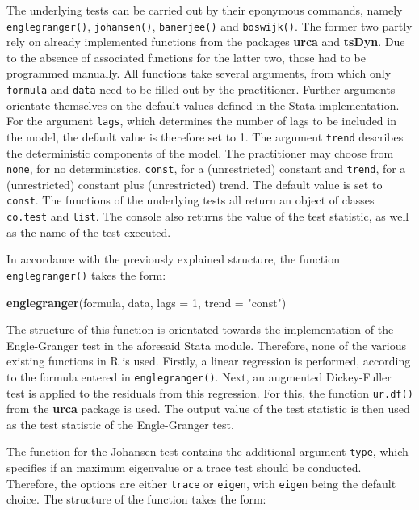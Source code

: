 \documentclass[11pt,a4paper]{article}
\newenvironment{Shaded}{\begin{snugshade}}{\end{snugshade}}
\newcommand{\DataTypeTok}[1]{\textcolor[rgb]{0.13,0.29,0.53}{#1}}
\newcommand{\DecValTok}[1]{\textcolor[rgb]{0.00,0.00,0.81}{#1}}
\newcommand{\KeywordTok}[1]{\textcolor[rgb]{0.13,0.29,0.53}{\textbf{#1}}}
\newcommand{\NormalTok}[1]{#1}
\newcommand{\StringTok}[1]{\textcolor[rgb]{0.31,0.60,0.02}{#1}}
\begin{document}
The underlying tests can be carried out by their eponymous commands,
namely \texttt{englegranger()}, \texttt{johansen()}, \texttt{banerjee()}
and \texttt{boswijk()}. The former two partly rely on already
implemented functions from the packages \textbf{urca} and
\textbf{tsDyn}. Due to the absence of associated functions for the
latter two, those had to be programmed manually. All functions take
several arguments, from which only \texttt{formula} and \texttt{data}
need to be filled out by the practitioner. Further arguments orientate
themselves on the default values defined in the Stata implementation.
For the argument \texttt{lags}, which determines the number of lags to
be included in the model, the default value is therefore set to 1. The
argument \texttt{trend} describes the deterministic components of the
model. The practitioner may choose from \texttt{none}, for no
deterministics, \texttt{const}, for a (unrestricted) constant and
\texttt{trend}, for a (unrestricted) constant plus (unrestricted) trend.
The default value is set to \texttt{const}. The functions of the
underlying tests all return an object of classes \texttt{co.test} and
\texttt{list}. The console also returns the value of the test statistic,
as well as the name of the test executed.

In accordance with the previously explained structure, the function
\texttt{englegranger()} takes the form:

\begin{Shaded}
\begin{Highlighting}[]
\KeywordTok{englegranger}\NormalTok{(formula, data, }\DataTypeTok{lags =} \DecValTok{1}\NormalTok{, }\DataTypeTok{trend =} \StringTok{"const"}\NormalTok{)}
\end{Highlighting}
\end{Shaded}

The structure of this function is orientated towards the implementation
of the Engle-Granger test in the aforesaid Stata module. Therefore, none
of the various existing functions in R is used. Firstly, a linear
regression is performed, according to the formula entered in
\texttt{englegranger()}. Next, an augmented Dickey-Fuller test is
applied to the residuals from this regression. For this, the function
\texttt{ur.df()} from the \textbf{urca} package is used. The output
value of the test statistic is then used as the test statistic of the
Engle-Granger test.

The function for the Johansen test contains the additional argument
\texttt{type}, which specifies if an maximum eigenvalue or a trace test
should be conducted. Therefore, the options are either \texttt{trace} or
\texttt{eigen}, with \texttt{eigen} being the default choice. The
structure of the function takes the form:
\end{document}
